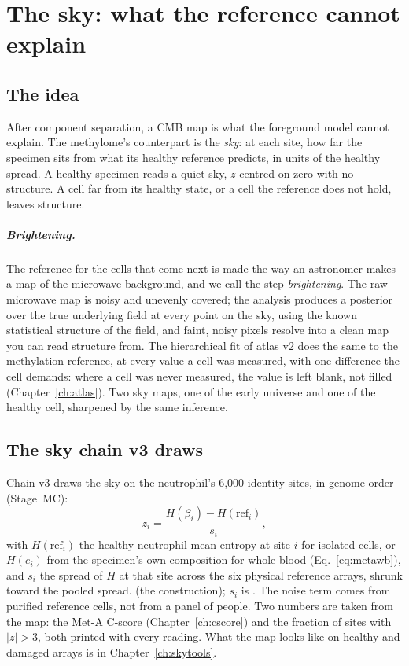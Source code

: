 \chapter{The sky: what the reference cannot explain}\label{ch:sky}

\section{The idea}

After component separation, a CMB map is what the foreground model cannot explain. The methylome's counterpart is the \emph{sky}: at each
site, how far the specimen sits from what its healthy reference predicts, in units of the healthy spread. A healthy specimen reads a quiet sky,
$z$ centred on zero with no structure. A cell far from its healthy state, or a cell the reference does not hold, leaves structure.

\paragraph{Brightening.} The reference for the cells that come next is made the way an astronomer makes a map of the microwave background,
and we call the step \emph{brightening}. The raw microwave map is noisy and unevenly covered; the analysis produces a posterior over the
true underlying field at every point on the sky, using the known statistical structure of the field, and faint, noisy pixels resolve into
a clean map you can read structure from. The hierarchical fit of atlas v2 does the same to the methylation reference, at every value a cell
was measured, with one difference the cell demands: where a cell was never measured, the value is left blank, not filled
(Chapter~\ref{ch:atlas}). Two sky maps, one of the early universe and one of the healthy cell, sharpened by the same inference. \analogy

\section{The sky chain v3 draws}

Chain v3 draws the sky on the neutrophil's 6,000 identity sites, in genome order (Stage~MC):
\begin{equation}
  z_i=\frac{H(\beta_i)-H(\mathrm{ref}_i)}{s_i},
  \label{eq:sky}
\end{equation}
with $H(\mathrm{ref}_i)$ the healthy neutrophil mean entropy at site $i$ for isolated cells, or $H(e_i)$ from the specimen's own composition for whole
blood (Eq.~\eqref{eq:metawb}), and $s_i$ the spread of $H$ at that site across the six physical reference arrays, shrunk toward the pooled spread.
\derived{} (the construction); $s_i$ is \calibrated. The noise term comes from purified reference cells,
not from a panel of people. Two numbers are taken from the map: the Met-A C-score (Chapter~\ref{ch:cscore}) and the fraction of sites with $|z|>3$, both
printed with every reading. What the map looks like on healthy and damaged arrays is in Chapter~\ref{ch:skytools}.

